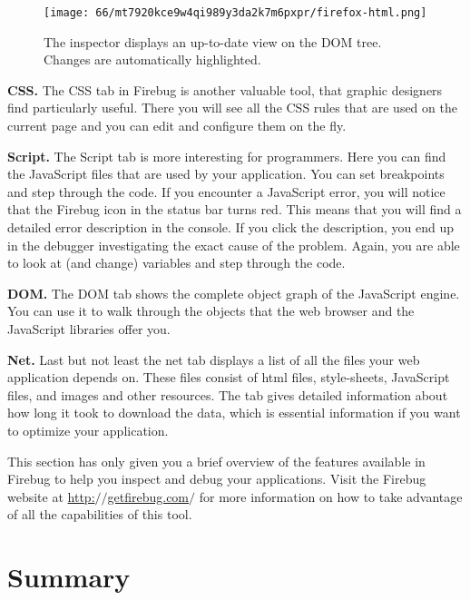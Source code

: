 \documentclass[a4paper,10pt,twoside]{book}
\begin{document}
\begin{figure}[h!tbp]
	\begin{center}
		\texttt{[image: 66/mt7920kce9w4qi989y3da2k7m6pxpr/firefox-html.png]}
		\caption{The inspector displays an up-to-date view on the DOM tree. Changes are automatically highlighted.\label{book:web20:scriptaculous:debugging:firefoxhtml}}
	\end{center}
\end{figure}


\textbf{CSS.} The CSS tab in Firebug is another valuable tool, that graphic designers find particularly useful. There you will see all the CSS rules that are used on the current page and you can edit and configure them on the fly.

\textbf{Script.} The Script tab is more interesting for programmers. Here you can find the JavaScript files that are used by your application. You can set breakpoints and step through the code. If you encounter a JavaScript error, you will notice that the Firebug icon in the status bar turns red. This means that you will find a detailed error description in the console. If you click the description, you end up in the debugger investigating the exact cause of the problem. Again, you are able to look at (and change) variables and step through the code.

\textbf{DOM.} The DOM tab shows the complete object graph of the JavaScript engine. You can use it to walk through the objects that the web browser and the JavaScript libraries offer you.

\textbf{Net.} Last but not least the net tab displays a list of all the files your web application depends on. These files consist of html files, style-sheets, JavaScript files, and images and other resources. The tab gives detailed information about how long it took to download the data, which is essential information if you want to optimize your application.

This section has only given you a brief overview of the features available in Firebug to help you inspect and debug your applications. Visit the Firebug website at \href{http://getfirebug.com/}{http:$/$$/$getfirebug.com$/$} for more information on how to take advantage of all the capabilities of this tool.

\section{Summary}
\label{book:web20:scriptaculous:summary}
\end{document}

